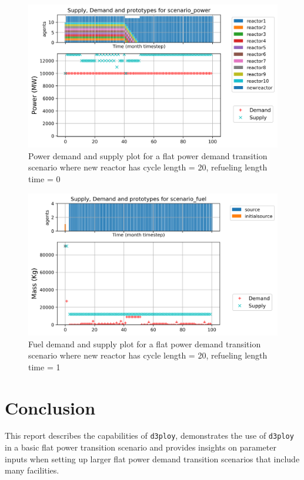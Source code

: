 \documentclass[11pt,letterpaper]{article}
\newcommand{\deploy}{\texttt{d3ploy}\xspace}%
\begin{document}
\begin{figure}[!htbp]
	\begin{center}
		\includegraphics[scale=0.65]{figures/flattransition-power-norefuel.png}
	\end{center}
        \caption{Power demand and supply plot for a flat power demand transition scenario where new reactor has cycle length = 20, refueling length time = 0}
	\label{fig:flattransition-power-norefuel}
\end{figure}

\begin{figure}[!htbp]
	\begin{center}
		\includegraphics[scale=0.65]{figures/flattransition-fuel.png}
	\end{center}
        \caption{Fuel demand and supply plot for a flat power demand transition scenario where new reactor has cycle length = 20, refueling length time = 1}
	\label{fig:flattransition-fuel}
\end{figure}

\pagebreak
\section{Conclusion}
This report describes the capabilities of \deploy, demonstrates 
the use of \deploy in a basic flat power transition scenario and 
provides insights on parameter inputs when setting up larger flat 
power demand transition scenarios that include many facilities. 
\end{document}
